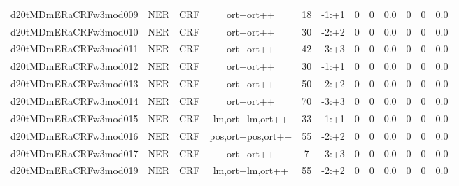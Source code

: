 \documentclass[a4paper]{article}
\begin{document}
\begin{landscape}
\begin{center}
\begin{tabular}{ |c|c|c|c|c|c|c|c|c|c|c|c|}
 
 	
 	\small{ d20tMDmERaCRFw3mod009 } & \small{ NER} & \small{  CRF }  & ort+ort++  &  18 &  \small{  -1:+1 }  &  0 & 0 & 0.0  &  0 & 0 & 0.0 \\
 	

 
 	
 	\small{ d20tMDmERaCRFw3mod010 } & \small{ NER} & \small{  CRF }  & ort+ort++  &  30 &  \small{  -2:+2 }  &  0 & 0 & 0.0  &  0 & 0 & 0.0 \\
 	

 
 	
 	\small{ d20tMDmERaCRFw3mod011 } & \small{ NER} & \small{  CRF }  & ort+ort++  &  42 &  \small{  -3:+3 }  &  0 & 0 & 0.0  &  0 & 0 & 0.0 \\
 	

 
 	
 	\small{ d20tMDmERaCRFw3mod012 } & \small{ NER} & \small{  CRF }  & ort+ort++  &  30 &  \small{  -1:+1 }  &  0 & 0 & 0.0  &  0 & 0 & 0.0 \\
 	

 
 	
 	\small{ d20tMDmERaCRFw3mod013 } & \small{ NER} & \small{  CRF }  & ort+ort++  &  50 &  \small{  -2:+2 }  &  0 & 0 & 0.0  &  0 & 0 & 0.0 \\
 	

 
 	
 	\small{ d20tMDmERaCRFw3mod014 } & \small{ NER} & \small{  CRF }  & ort+ort++  &  70 &  \small{  -3:+3 }  &  0 & 0 & 0.0  &  0 & 0 & 0.0 \\
 	

 
 	
 	\small{ d20tMDmERaCRFw3mod015 } & \small{ NER} & \small{  CRF }  & lm,ort+lm,ort++  &  33 &  \small{  -1:+1 }  &  0 & 0 & 0.0  &  0 & 0 & 0.0 \\
 	

 
 	
 	\small{ d20tMDmERaCRFw3mod016 } & \small{ NER} & \small{  CRF }  & pos,ort+pos,ort++  &  55 &  \small{  -2:+2 }  &  0 & 0 & 0.0  &  0 & 0 & 0.0 \\
 	

 
 	
 	\small{ d20tMDmERaCRFw3mod017 } & \small{ NER} & \small{  CRF }  & ort+ort++  &  7 &  \small{  -3:+3 }  &  0 & 0 & 0.0  &  0 & 0 & 0.0 \\
 	

 
 	
 	\small{ d20tMDmERaCRFw3mod019 } & \small{ NER} & \small{  CRF }  & lm,ort+lm,ort++  &  55 &  \small{  -2:+2 }  &  0 & 0 & 0.0  &  0 & 0 & 0.0 \\
 	


\end{tabular}
\end{center}
\end{landscape}
\end{document}
